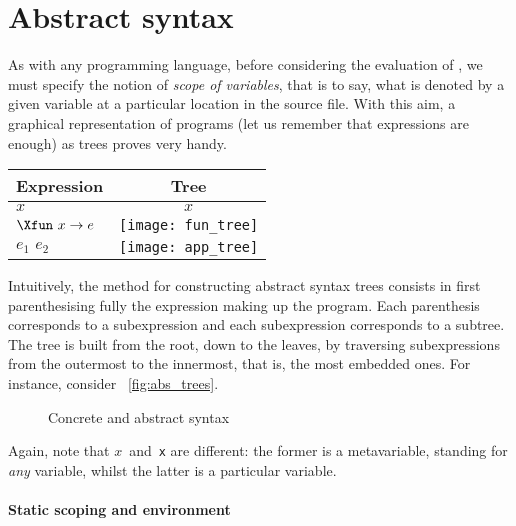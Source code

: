 \section*{Abstract syntax}

As with any programming language, before considering the evaluation of
\OCaml, we must specify the notion of \emph{scope of variables}, that
is to say, what is denoted by a given variable at a particular
location in the source file. With this aim, a graphical representation
of programs (let us remember that expressions are enough) as trees
proves very handy.
\begin{center}
\begin{tabular}{l|c}
\toprule
  \multicolumn{1}{c}{Expression}
& \multicolumn{1}{c}{Tree}\\
\toprule
    $x$
  & $x$\\
    $\Xfun \,\, x \rightarrow e$
  & \texttt{[image: fun\_tree]}\\
    $e_1 \,\, e_2$
  & \texttt{[image: app\_tree]}\\
\bottomrule
\end{tabular}
\end{center}
Intuitively, the method for constructing abstract syntax trees
consists in first parenthesising fully the expression making up the
program. Each parenthesis corresponds to a subexpression and each
subexpression corresponds to a subtree. The tree is built from the
root, down to the leaves, by traversing subexpressions from the
outermost to the innermost, that is, the most embedded ones. For
instance, consider
\fig~\vref{fig:abs_trees}.
\begin{figure}
\centering
{}
\qquad
{}
\qquad
{}
\caption{Concrete and abstract syntax\label{fig:abs_trees}}
\end{figure}
Again, note that $x$~and~\texttt{x} are different: the former is a
metavariable, standing for \emph{any} \OCaml variable, whilst the
latter is a particular \OCaml variable.

\paragraph{Static scoping and environment}

